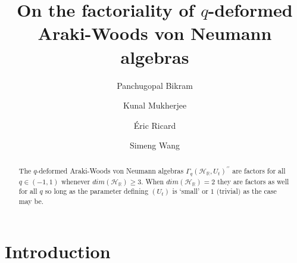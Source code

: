 \documentclass[12pt, a4paper,reqno]{amsart}
\theoremstyle{definition}
\renewcommand{\geq}{\geqslant}
\def\R{\mathbb R}
\newcommand{\CH}{\mathcal{H}}
\begin{document}
\title[\lowercase{\textit{q}}-deformed  Araki-Woods von Neumann algebras]{On the factoriality of $q$-deformed  Araki-Woods von Neumann algebras}


\author[Bikram]{Panchugopal Bikram}
\author[Mukherjee]{Kunal Mukherjee}
\author[Ricard]{\'{E}ric Ricard}
\author[Wang]{Simeng Wang}

\address{School of Mathematical Sciences,
National Institute of Science Education and Research,  Bhubaneswar, An OCC of Homi Bhabha National Institute,  Jatni- 752050, India}
\address{Department of Mathematics, IIT Madras, Chennai - 600036, India.}
\address{Normandie Univ, UNICAEN, CNRS, Laboratoire de Math{\'e}matiques Nicolas Oresme, 14000 Caen, France}
\address{Institute for Advanced Study in Mathematics, Harbin Institute of Technology, Harbin, 150001, China}
 






\begin{abstract} 
The $q$-deformed Araki-Woods von Neumann algebras $\Gamma_q(\CH_\R,U_t)^{\prime\prime}$ are factors for all $q\in (-1,1)$ whenever $dim(\CH_\R)\geq 3$. When $dim(\CH_\R)=2$ they are factors as well for all $q$ so long as the parameter defining $(U_t)$ is `small' or $1$ $($trivial$)$ as the case may be. 
\end{abstract} 
\maketitle 


\section{Introduction}
\end{document}
